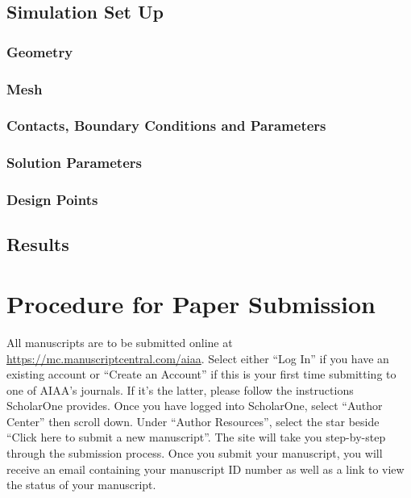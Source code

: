 \documentclass[journal]{new-aiaa}
\begin{document}
\subsection{Simulation Set Up}
\subsubsection{Geometry}
\subsubsection{Mesh}
\subsubsection{Contacts, Boundary Conditions and Parameters}
\subsubsection{Solution Parameters}
\subsubsection{Design Points}
\subsection{Results}

\section{Procedure for Paper Submission}

All manuscripts are to be submitted online at \url{https://mc.manuscriptcentral.com/aiaa}. Select either “Log In” if you have an existing account or “Create an Account” if this is your first time submitting to one of AIAA’s journals. If it’s the latter, please follow the instructions ScholarOne provides. Once you have logged into ScholarOne, select “Author Center” then scroll down. Under “Author Resources”, select the star beside “Click here to submit a new manuscript”. The site will take you step-by-step through the submission process. Once you submit your manuscript, you will receive an email containing your manuscript ID number as well as a link to view the status of your manuscript. 
\end{document}
